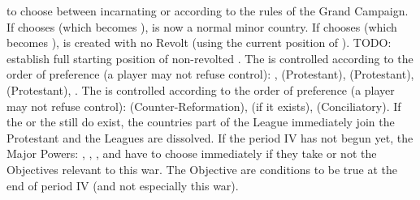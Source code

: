 \begin{digressions}
  to choose between incarnating \AUS or \HOL according to the rules of the
  Grand Campaign.
  \bparag If \VEN chooses \AUSMin (which becomes \AUS), \payshollande is now a
  normal minor country.
  \bparag If \VEN chooses \HOLmin (which becomes \HOL), \HOL is created with
  no Revolt (using the current position of \HOLmin).
  \bparag TODO: establish full starting position of non-revolted \HOL.
  \aparag The \alliance is controlled according to the order of preference (a
  player may not refuse control): \HOL, \ENG (Protestant), \FRA (Protestant),
  \SUE (Protestant), \RUS.
  \aparag The \ligue is controlled according to the order of preference (a
  player may not refuse control): \SPA (Counter-Reformation), \AUS (if it
  exists), \SPA (Conciliatory).
  \aparag If the  or the  still do exist, the countries part of the League immediately join
  the Protestant \alliance and the Leagues are dissolved.
  \aparag If the period IV has not begun yet, the Major Powers: \SPA, \HOL,
  \SUE, \FRA and \AUT have to choose immediately if they take or not the
  Objectives relevant to this war. The Objective are conditions to be true at
  the end of period IV (and not especially this war).



\end{digressions}
